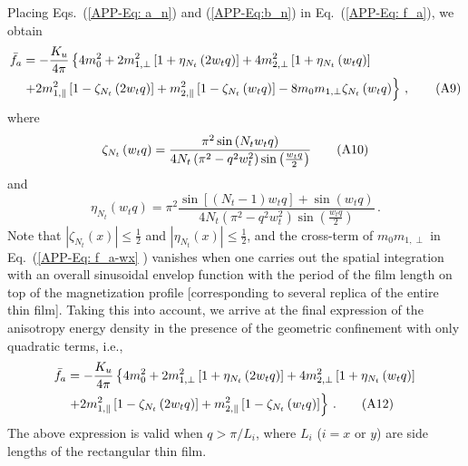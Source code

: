 \documentclass[10pt,onecolumn,prb,aps,notitlepage]{revtex4}
\begin{document}
Placing Eqs.~(\ref{APP-Eq: a_n}) and (\ref{APP-Eq:b_n}) in Eq.~(\ref{APP-Eq:
f_a}), we obtain
\begin{align}
\bar{f}_{a} &=-\frac{K_{u}}{4\pi }\left\{ 4m_{0}^{2}+2m_{1,\perp }^{2}\left[
1+\eta _{N_{t}}\left( 2w_{t}q\right) \right] +4m_{2,\perp }^{2}\left[ 1+\eta
_{N_{t}}\left( w_{t}q\right) \right] \right.   \notag \\
&\left. +2m_{1,\parallel }^{2}\left[ 1-\zeta _{N_{t}}\left( 2w_{t}q\right) %
\right] +m_{2,\parallel }^{2}\left[ 1-\zeta _{N_{t}}\left( w_{t}q\right) %
\right] -8m_{0}m_{1,\perp }\zeta _{N_{t}}\left( w_{t}q\right) \right\}\,,  \tag{A9}
\label{APP-Eq: f_a-wx}
\end{align}%
where
\begin{equation}
\zeta _{N_{t}}\left( w_{t}q\right) =\frac{\pi ^{2}\sin \left( N_{t}w_{t}q%
\right) }{4N_{t}\left( \pi ^{2}-q^{2}w_{t}^{2}\right) \sin \left( \frac{%
w_{t}q}{2}\right) }    \tag{A10}
\end{equation}%
and
\begin{equation}
\eta _{N_{t}}\left( w_{t}q\right) =\pi ^{2}\frac{\sin \left[ \left(
N_{t}-1\right) w_{t}q\right] +\sin \left( w_{t}q\right) }{4N_{t}\left( \pi
^{2}-q^{2}w_{t}^{2}\right) \sin \left( \frac{w_{t}q}{2}\right) }\,.   \tag{A11}
\end{equation}%
Note that $\left\vert \zeta _{N_{t}}\left( x\right) \right\vert \leq \frac{1}{2}$
and $\left\vert \eta _{N_{t}}\left( x\right) \right\vert \leq \frac{1}{2}$, and  the cross-term of $m_{0}m_{1,\perp }$ in Eq.~(\ref{APP-Eq: f_a-wx}%
) vanishes when one carries out the spatial integration with an overall
sinusoidal envelop function with the period of the film length on top of the
magnetization profile [corresponding to several replica of the entire thin
film]. Taking this into account, we arrive at the final expression of the
anisotropy energy density in the presence of the geometric confinement with
only quadratic terms, i.e.,
\begin{align}
\bar{f}_{a} &=-\frac{K_{u}}{4\pi }\left\{ 4m_{0}^{2}+2m_{1,\perp }^{2}\left[
1+\eta _{N_{t}}\left( 2w_{t}q\right) \right] +4m_{2,\perp }^{2}\left[ 1+\eta
_{N_{t}}\left( w_{t}q\right) \right] \right.   \notag \\
&\left. +2m_{1,\parallel }^{2}\left[ 1-\zeta _{N_{t}}\left( 2w_{t}q\right) %
\right] +m_{2,\parallel }^{2}\left[ 1-\zeta _{N_{t}}\left( w_{t}q\right) %
\right] \right\}\,.  \tag{A12}
\end{align}
The above expression is valid when %
$q>\pi /L_{i}$, where $L_{i}$ ($i=x$ or $y$) are side lengths of the rectangular thin film.



\end{document}
